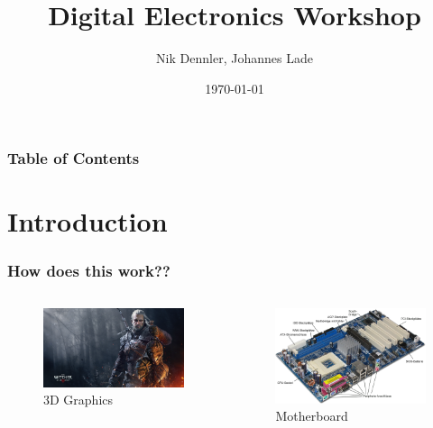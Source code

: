 \documentclass{beamer}
\begin{document}
\title{Digital Electronics Workshop} 
\author{Nik Dennler, Johannes Lade}
\date{\today} 

\begin{frame}
\titlepage
\end{frame} 

\begin{frame}\frametitle{Table of Contents}\tableofcontents
\end{frame} 
\section{Introduction}
\begin{frame}\frametitle{How does this work??}
  \begin{columns}
  \begin{column}{6cm}
  \begin{figure}
  \includegraphics[width=1\textwidth]{witcher}
  \caption{3D Graphics}
  \end{figure}
  \end{column}
  \begin{column}{6cm}
  \begin{figure}
  \includegraphics[width=1\textwidth]{motherboard}
  \caption{Motherboard}
  \end{figure}
  \end{column}
  \end{columns}
\end{frame}
\end{document}
